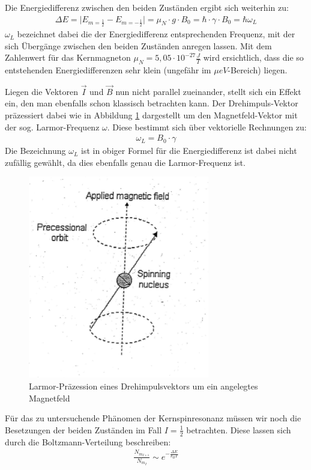 Die Energiedifferenz zwischen den beiden Zuständen ergibt sich weiterhin zu:
\begin{align}
\Delta E = \vert E_{m=\frac{1}{2}} - E_{m=-\frac{1}{2}} \vert = \mu_N \cdot g \cdot B_0 = \hbar \cdot \gamma \cdot B_0 = \hbar \omega_L
\end{align}
$\omega_L$ bezeichnet dabei die der Energiedifferenz entsprechenden Frequenz, mit der sich Übergänge zwischen den beiden Zuständen anregen lassen. Mit dem Zahlenwert für das Kernmagneton $\mu_N=5,05 \cdot 10^{-27} \frac{J}{T}$ wird ersichtlich, dass die so entstehenden Energiedifferenzen sehr klein (ungefähr im $\mu eV$-Bereich) liegen.

Liegen die Vektoren $\overrightarrow{I}$ und $\overrightarrow{B}$ nun nicht parallel zueinander, stellt sich ein Effekt ein, den man ebenfalls schon klassisch betrachten kann. Der Drehimpuls-Vektor präzessiert dabei wie in Abbildung \ref{Larmor} dargestellt  um den Magnetfeld-Vektor mit der sog. Larmor-Frequenz $\omega$. Diese bestimmt sich über vektorielle Rechnungen zu:
\begin{align}
\omega_L=B_0 \cdot \gamma
\end{align}
Die Bezeichnung $\omega_L$ ist in obiger Formel für die Energiedifferenz ist dabei nicht zufällig gewählt, da dies ebenfalls genau die Larmor-Frequenz ist. 

\begin{figure}[htbp] 
     \includegraphics{Larmor.png}
  \caption{Larmor-Präzession eines Drehimpulsvektors um ein angelegtes Magnetfeld}
  \label{Larmor}
\end{figure}

Für das zu untersuchende Phänomen der Kernspinresonanz müssen wir noch die Besetzungen der beiden Zuständen im Fall $I=\frac{1}{2}$ betrachten. Diese lassen sich durch die Boltzmann-Verteilung beschreiben:
\begin{align}
\frac{N_{m_{I+1}}}{N_{m_I}} \sim e^{-\frac{\Delta E}{k_BT}}
\end{align}

